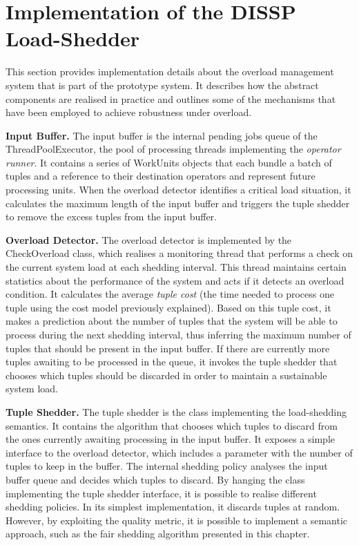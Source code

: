 
\section{Implementation of the DISSP Load-Shedder}

This section provides implementation details about the overload management system that is part
of the \sys prototype system. It describes how the abstract components are realised
in practice and outlines some of the mechanisms that have been employed to achieve robustness under
overload.

\textbf{Input Buffer.} The input buffer is the internal pending jobs queue of the ThreadPoolExecutor, the
pool of processing threads implementing the \emph{operator runner}. It contains a series of WorkUnits
objects that each bundle a batch of tuples and a reference to their destination operators and represent
future processing units. When the overload detector identifies a critical load situation, it
calculates the maximum length of the input buffer and triggers the tuple shedder to remove the
excess tuples from the input buffer.

\textbf{Overload Detector.} The overload detector is implemented by the CheckOverload class, which
realises a monitoring thread that performs a check on the current system load at each shedding
interval. This thread maintains certain statistics about the performance of the system and acts if it
detects an overload condition. It calculates the average \emph{tuple cost}  (\ie the time needed to
process one tuple using the cost model previously explained). Based on this tuple cost, it makes a
prediction about the number of tuples that the system will be able to process during the next shedding
interval, thus inferring the maximum number of tuples that should be present in the input buffer. If
there are currently more tuples awaiting to be processed in the queue, it invokes the tuple shedder that
chooses which tuples should be discarded in order to maintain a sustainable system load.

\textbf{Tuple Shedder.} The tuple shedder is the class implementing the \mbox{load-shedding} semantics.
It contains the algorithm that chooses which tuples to discard from the ones currently awaiting
processing in the input buffer. It exposes a simple interface to the overload detector, which
includes a parameter with the number of tuples to keep in the buffer.
The internal shedding policy analyses the input buffer queue and decides which tuples to discard.
By hanging the class implementing the tuple shedder interface, it is possible
to realise different shedding policies. In its simplest implementation, it discards tuples at
random. However, by exploiting the \sic quality metric, it is possible to implement a semantic
approach, such as the fair shedding algorithm presented in this chapter.

